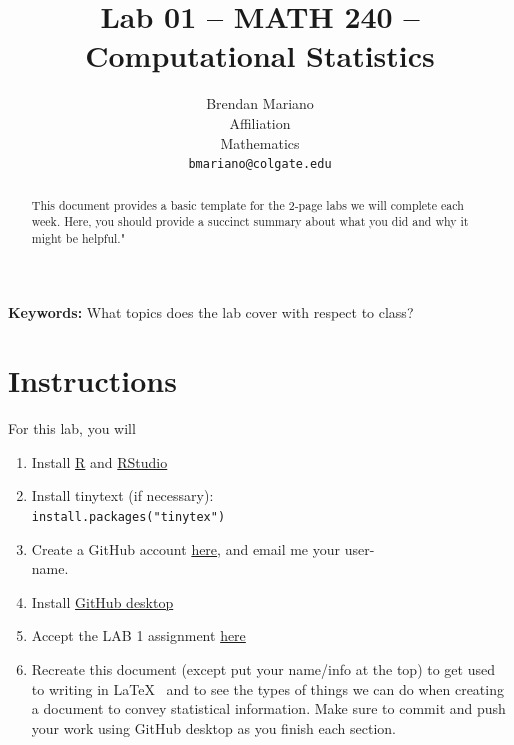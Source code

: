 \documentclass{article}\usepackage[]{graphicx}\usepackage[]{xcolor}
\begin{document}
\vspace{-1in}
\title{Lab 01 -- MATH 240 -- Computational Statistics}

\author{
  Brendan Mariano \\
  Affiliation  \\
  Mathematics  \\
  {\tt bmariano@colgate.edu}
}

\date{}

\maketitle

\begin{multicols}{2}
\begin{abstract}
This document provides a basic template for the 2-page labs we will complete each week. Here, you should provide a succinct summary about what you did and why it might be helpful."
\end{abstract}

\indent \textbf{Keywords:} What topics does the lab cover with respect to class?

\section{Instructions}
For this lab, you will
\begin{enumerate}[1.]\itemsep0em
  \item Install \href{https://cran.rstudio.com/}{R} and \href{https://posit.co/download/rstudio-desktop/}{RStudio}
  \item Install tinytext (if necessary):     \\\texttt{install.packages("tinytex")}
  \item Create a GitHub account \href{https://github.com/}{here}, and email me your user- \\name.
  \item Install \href{https://desktop.github.com/}{GitHub desktop}
  \item Accept the LAB 1 assignment \href{https://classroom.github.com/a/gfC_xMMl}{here}
  \item Recreate this document (except put your name/info at the top) to get used to writing in \LaTeX~  and to see the types of things we can do when creating a document to convey statistical information. Make sure to commit and push your work using GitHub desktop as you finish each section.
  
  
\end{enumerate}


\end{multicols}
\end{document}
